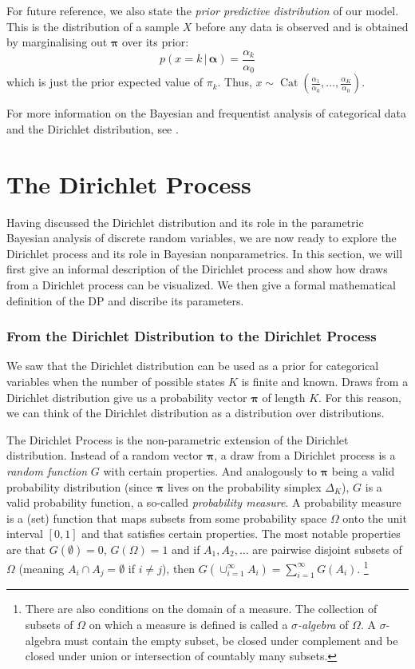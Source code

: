 \documentclass[final,3p,times,twocolumn]{elsarticle}
\DeclareMathOperator*{\Cat}{Cat}
\let\bs\boldsymbol
\begin{document}
For future reference, we also state the \emph{prior predictive distribution} of our model.
This is the distribution of a sample $X$ before any data is observed and is obtained by marginalising out $\bs \pi$ over its prior:
\begin{equation}
\label{eqn:dirpriorpredictive}
p(x = k\,|\,\bs \alpha) = \frac{\alpha_k}{\alpha_0}
\end{equation}
which is just the prior expected value of $\pi_k$.
Thus, $x \sim \Cat(\frac{\alpha_1}{\alpha_0},\dots,\frac{\alpha_K}{\alpha_0})$.

For more information on the Bayesian and frequentist analysis of categorical data and the Dirichlet distribution, see \cite{Bishop, Murphy}.


\section{The Dirichlet Process}
\label{sect:dp}
Having discussed the Dirichlet distribution and its role in the parametric Bayesian analysis of discrete random variables, we are now ready to explore the Dirichlet process and its role in Bayesian nonparametrics.
In this section, we will first give an informal description of the Dirichlet process and show how draws from a Dirichlet process can be visualized.
We then give a formal mathematical definition of the DP and discribe its parameters.

\subsubsection*{\normalfont \small \bfseries From the Dirichlet Distribution to the Dirichlet Process}
We saw that the Dirichlet distribution can be used as a prior for categorical variables when the number of possible states $K$ is finite and known. Draws from a Dirichlet distribution give us a probability vector $\bs \pi$ of length $K$. For this reason, we can think of the Dirichlet distribution as a distribution over distributions.

The Dirichlet Process is the non-parametric extension of the Dirichlet distribution.
Instead of a random vector $\bs \pi$, a draw from a Dirichlet process is a \emph{random function} $G$ with certain properties.
And analogously to $\bs \pi$ being a valid probability distribution (since $\bs \pi$ lives on the probability simplex $\Delta_K$), $G$ is a valid probability function, a so-called \emph{probability measure}.
A probability measure is a (set) function that maps subsets from some probability space $\Omega$ onto the unit interval $[0,1]$ and that satisfies certain properties.
The most notable properties are that $G(\emptyset)=0$, $G(\Omega)=1$ and if $A_1,A_2,\dots$ are pairwise disjoint subsets of $\Omega$ (meaning $A_i\cap A_j = \emptyset$ if $i\neq j$), then $G(\cup_{i=1}^\infty A_i) = \sum_{i=1}^\infty G(A_i)$.
\footnote{There are also conditions on the domain of a measure.
The collection of subsets of $\Omega$ on which a measure is defined is called a \emph{$\sigma$-algebra} of $\Omega$.
A $\sigma$-algebra must contain the empty subset, be closed under complement and be closed under union or intersection of countably many subsets.}
\end{document}

